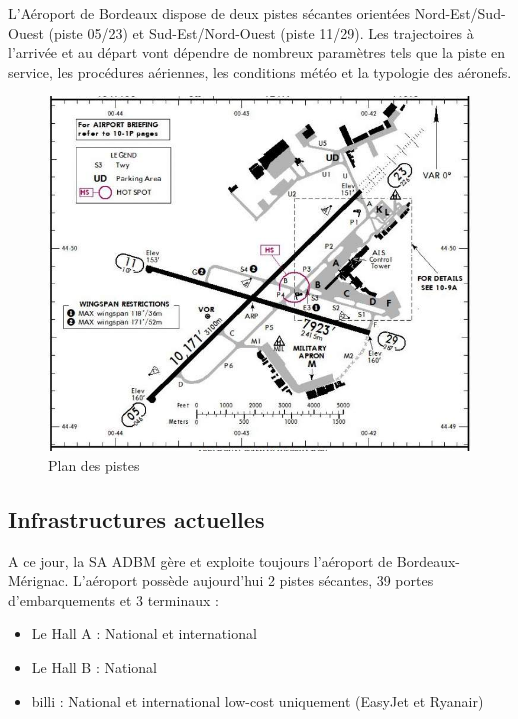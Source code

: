 L’Aéroport de Bordeaux dispose de deux pistes sécantes orientées Nord-Est/Sud-Ouest (piste 05/23) et Sud-Est/Nord-Ouest (piste 11/29). Les trajectoires à l’arrivée et au départ vont dépendre de nombreux paramètres tels que la piste en service, les procédures aériennes, les conditions météo et la typologie des aéronefs.\newline

\begin{figure}[hbt!]
  \centering
  \includegraphics[width=12.1cm]{Images/pistes.jpg}
  \caption{Plan des pistes}
  \label{fig:pistes}
\end{figure}

\newpage

\subsection{Infrastructures actuelles}


A ce jour, la SA ADBM gère et exploite toujours l'aéroport de Bordeaux-Mérignac.
L'aéroport possède aujourd'hui 2 pistes sécantes, 39 portes d'embarquements et 3 terminaux :

\begin{itemize}
    \item Le Hall A : National et international
    \item Le Hall B : National
    \item billi : National et international low-cost uniquement (EasyJet et Ryanair)\newline
\end{itemize}

